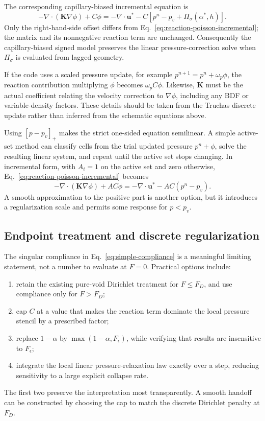 \documentclass[11pt]{article}
\newcommand{\pos}[1]{\left[#1\right]_+}
\newcommand{\divg}{\nabla\!\cdot}
\newcommand{\uv}{\boldsymbol{u}}
\begin{document}
The corresponding capillary-biased incremental equation is
\begin{equation}
  \boxed{
  -\divg(\boldsymbol K\nabla\phi)+C\phi
  =-\divg\uv^*-C\left[p^n-p_v+\Pi_\sigma(\alpha^*,h)\right].}
  \label{eq:capillary-incremental}
\end{equation}
Only the right-hand-side offset differs from
Eq.~\eqref{eq:reaction-poisson-incremental}; the matrix and its nonnegative reaction
term are unchanged.  Consequently the capillary-biased signed model preserves the
linear pressure-correction solve when \(\Pi_\sigma\) is evaluated from lagged geometry.

If the code uses a scaled pressure update, for example
\(p^{n+1}=p^n+\omega_p\phi\), the reaction contribution multiplying \(\phi\) becomes
\(\omega_p C\phi\).  Likewise, \(\boldsymbol K\) must be the actual coefficient relating
the velocity correction to \(\nabla\phi\), including any BDF or variable-density factors.
These details should be taken from the Truchas discrete update rather than inferred from
the schematic equations above.

Using \(\pos{p-p_v}\) makes the strict one-sided equation semilinear.  A simple active-set method can
classify cells from the trial updated pressure \(p^n+\phi\), solve the resulting linear
system, and repeat until the active set stops changing.  In incremental form, with
\(A_i=1\) on the active set and zero otherwise, Eq.~\eqref{eq:reaction-poisson-incremental}
becomes
\begin{equation}
  -\divg(\boldsymbol K\nabla\phi)+A C\phi
  =-\divg\uv^*-A C(p^n-p_v).
  \label{eq:active-incremental}
\end{equation}
A smooth approximation to the positive part is another option, but it introduces a
regularization scale and permits some response for \(p<p_v\).

\subsection{Endpoint treatment and discrete regularization}

The singular compliance in Eq.~\eqref{eq:simple-compliance} is a meaningful limiting
statement, not a number to evaluate at \(F=0\).  Practical options include:
\begin{enumerate}
  \item retain the existing pure-void Dirichlet treatment for \(F\le F_D\), and use
        compliance only for \(F>F_D\);
  \item cap \(C\) at a value that makes the reaction term dominate the local pressure
        stencil by a prescribed factor;
  \item replace \(1-\alpha\) by \(\max(1-\alpha,F_\epsilon)\), while verifying that
        results are insensitive to \(F_\epsilon\);
  \item integrate the local linear pressure-relaxation law exactly over a step, reducing
        sensitivity to a large explicit collapse rate.
\end{enumerate}
The first two preserve the interpretation most transparently.  A smooth handoff can be
constructed by choosing the cap to match the discrete Dirichlet penalty at \(F_D\).
\end{document}
